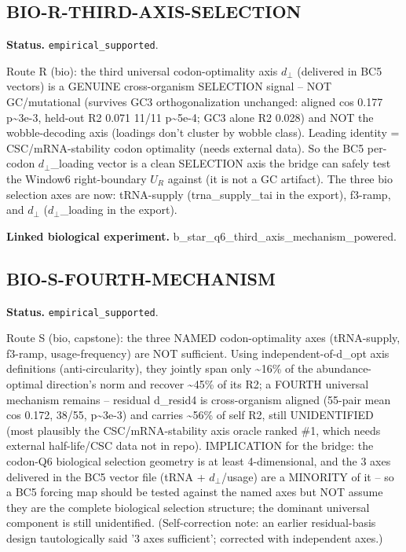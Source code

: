 \subsection{BIO-R-THIRD-AXIS-SELECTION}
\textbf{Status.} \texttt{empirical\_supported}.

Route R (bio): the third universal codon-optimality axis $d_{\perp}$ (delivered in BC5 vectors) is a
GENUINE cross-organism SELECTION signal -- NOT GC/mutational (survives GC3 orthogonalization
unchanged: aligned cos 0.177 p\textasciitilde{}3e-3, held-out R2 0.071 11/11 p\textasciitilde{}5e-4;
GC3 alone R2 0.028) and NOT the wobble-decoding axis (loadings don't cluster by wobble class).
Leading identity = CSC/mRNA-stability codon optimality (needs external data). So the BC5 per-codon
$d_{\perp}$\_loading vector is a clean SELECTION axis the bridge can safely test the Window6
right-boundary $U_R$ against (it is not a GC artifact). The three bio selection axes are now:
tRNA-supply (trna\_supply\_tai in the export), f3-ramp, and $d_{\perp}$ ($d_{\perp}$\_loading in the
export).

\textbf{Linked biological experiment.} b\_star\_q6\_third\_axis\_mechanism\_powered.

\subsection{BIO-S-FOURTH-MECHANISM}
\textbf{Status.} \texttt{empirical\_supported}.

Route S (bio, capstone): the three NAMED codon-optimality axes (tRNA-supply, f3-ramp,
usage-frequency) are NOT sufficient. Using independent-of-d\_opt axis definitions
(anti-circularity), they jointly span only \textasciitilde{}16\% of the abundance-optimal
direction's norm and recover \textasciitilde{}45\% of its R2; a FOURTH universal mechanism remains
-- residual d\_resid4 is cross-organism aligned (55-pair mean cos 0.172, 38/55,
p\textasciitilde{}3e-3) and carries \textasciitilde{}56\% of self R2, still UNIDENTIFIED (most
plausibly the CSC/mRNA-stability axis oracle ranked \#1, which needs external half-life/CSC data not
in repo). IMPLICATION for the bridge: the codon-Q6 biological selection geometry is at least
4-dimensional, and the 3 axes delivered in the BC5 vector file (tRNA + $d_{\perp}$/usage) are a
MINORITY of it -- so a BC5 forcing map should be tested against the named axes but NOT assume they
are the complete biological selection structure; the dominant universal component is still
unidentified. (Self-correction note: an earlier residual-basis design tautologically said '3 axes
sufficient'; corrected with independent axes.)

